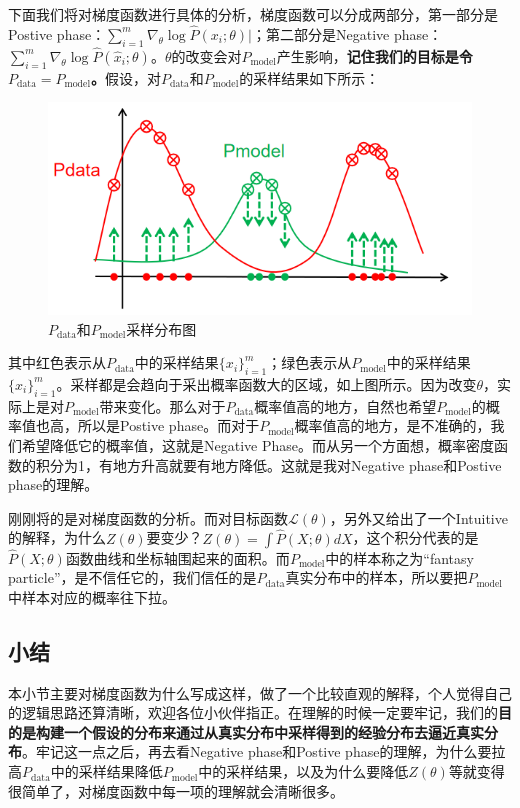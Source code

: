 \documentclass[a4paper]{article}
\begin{document}
下面我们将对梯度函数进行具体的分析，梯度函数可以分成两部分，第一部分是Postive phase：$\sum_{i=1}^m \nabla_\theta \log \hat{P}(x_i;\theta)|$；第二部分是Negative phase：$\sum_{i=1}^m \nabla_\theta \log \hat{P}(\hat{x}_i;\theta)$。$\theta$的改变会对$P_{\mathrm{model}}$产生影响，\textbf{{\color{red}记住我们的目标是令$P_{\mathrm{data}} = P_{\mathrm{model}}$。}}假设，对$P_{\mathrm{data}}$和$P_{\mathrm{model}}$的采样结果如下所示：
\begin{figure}[H]
    \centering
    \includegraphics[width=.65\textwidth]{微信图片_20200308152246.png}
    \caption{$P_{\mathrm{data}}$和$P_\mathrm{model}$采样分布图}
    \label{fig:my_label_1}
\end{figure}
其中红色表示从$P_{\mathrm{data}}$中的采样结果$\{x_i\}_{i=1}^m$；绿色表示从$P_{\mathrm{model}}$中的采样结果$\{\hat{x}_i\}_{i=1}^m$。采样都是会趋向于采出概率函数大的区域，如上图所示。因为改变$\theta$，实际上是对$P_{\mathrm{model}}$带来变化。那么对于$P_{\mathrm{data}}$概率值高的地方，自然也希望$P_{\mathrm{model}}$的概率值也高，所以是Postive phase。而对于$P_{\mathrm{model}}$概率值高的地方，是不准确的，我们希望降低它的概率值，这就是Negative Phase。而从另一个方面想，概率密度函数的积分为1，有地方升高就要有地方降低。这就是我对Negative phase和Postive phase的理解。

刚刚将的是对梯度函数的分析。而对目标函数$\mathcal{L}(\theta)$，另外又给出了一个Intuitive的解释，为什么$Z(\theta)$要变少？$Z(\theta) = \int \hat{P}(X;\theta)dX$，这个积分代表的是$\hat{P}(X;\theta)$函数曲线和坐标轴围起来的面积。而$P_{\mathrm{model}}$中的样本称之为“fantasy particle”，是不信任它的，我们信任的是$P_{\mathrm{data}}$真实分布中的样本，所以要把$P_{\mathrm{model}}$中样本对应的概率往下拉。
\subsection{小结}
本小节主要对梯度函数为什么写成这样，做了一个比较直观的解释，个人觉得自己的逻辑思路还算清晰，欢迎各位小伙伴指正。在理解的时候一定要牢记，我们的\textbf{目的是构建一个假设的分布来通过从真实分布中采样得到的经验分布去逼近真实分布}。牢记这一点之后，再去看Negative phase和Postive phase的理解，为什么要拉高$P_{\mathrm{data}}$中的采样结果降低$P_{\mathrm{model}}$中的采样结果，以及为什么要降低$Z(\theta)$等就变得很简单了，对梯度函数中每一项的理解就会清晰很多。
\end{document}

